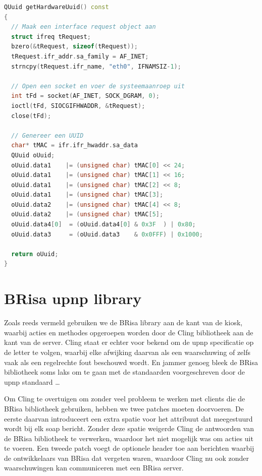 \begin{lstlisting}[language=C++, float, caption=Generatie van een \acs{uuid}., label=lst:uuid]
QUuid getHardwareUuid() const
{
  // Maak een interface request object aan
  struct ifreq tRequest;
  bzero(&tRequest, sizeof(tRequest));
  tRequest.ifr_addr.sa_family = AF_INET;
  strncpy(tRequest.ifr_name, "eth0", IFNAMSIZ-1);

  // Open een socket en voer de systeemaanroep uit
  int tFd = socket(AF_INET, SOCK_DGRAM, 0);
  ioctl(tFd, SIOCGIFHWADDR, &tRequest);
  close(tFd);

  // Genereer een UUID
  char* tMAC = ifr.ifr_hwaddr.sa_data
  QUuid oUuid;
  oUuid.data1    |= (unsigned char) tMAC[0] << 24;
  oUuid.data1    |= (unsigned char) tMAC[1] << 16;
  oUuid.data1    |= (unsigned char) tMAC[2] << 8;
  oUuid.data1    |= (unsigned char) tMAC[3];
  oUuid.data2    |= (unsigned char) tMAC[4] << 8;
  oUuid.data2    |= (unsigned char) tMAC[5];
  oUuid.data4[0]  = (oUuid.data4[0] & 0x3F  ) | 0x80;
  oUuid.data3     = (oUuid.data3    & 0x0FFF) | 0x1000;
  
  return oUuid;
}
\end{lstlisting}

\section{BRisa \acs{upnp} library}
\label{kiosk:realisatie:brisa}

Zoals reeds vermeld gebruiken we de BRisa library aan de kant van de kiosk, waarbij acties en methodes opgeroepen worden door de Cling bibliotheek aan de kant van de server. Cling staat er echter voor bekend om de \ac{upnp} specificatie op de letter te volgen, waarbij elke afwijking daarvan als een waarschuwing of zelfs vaak als een regelrechte fout beschouwd wordt. En jammer genoeg bleek de BRisa bibliotheek soms laks om te gaan met de standaarden voorgeschreven door de \ac{upnp} standaard \ldots

Om Cling te overtuigen om zonder veel probleem te werken met clients die de BRisa bibliotheek gebruiken, hebben we twee patches moeten doorvoeren. De eerste daarvan introduceert een extra spatie voor het  attribuut dat meegestuurd wordt bij elk \ac{soap} bericht. Zonder deze spatie weigerde Cling de antwoorden van de BRisa bibliotheek te verwerken, waardoor het niet mogelijk was om acties uit te voeren. Een tweede patch voegt de optionele  header toe aan berichten waarbij de ontwikkelaars van BRisa dat vergeten waren, waardoor Cling nu ook zonder waarschuwingen kan communiceren met een BRisa server.

